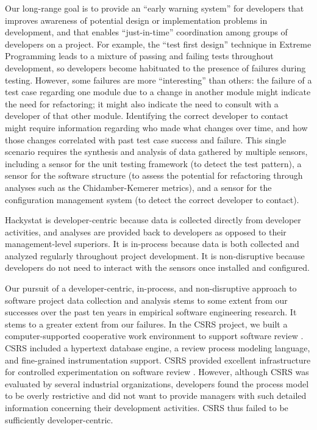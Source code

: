 Our long-range goal is to provide an ``early warning system'' for
developers that improves awareness of potential design or implementation
problems in development, and that enables ``just-in-time''
coordination among groups of developers on a project. For example, the
``test first design'' technique in Extreme Programming leads to a mixture
of passing and failing tests throughout development, so developers become habituated
to the presence of failures during testing. However, some
failures are more ``interesting'' than others: the failure of a test case
regarding one module due to a change in another module might indicate the
need for refactoring; it might also indicate the need to consult with a
developer of that other module. Identifying the correct developer to
contact might require information regarding who made what changes over
time, and how those changes correlated with past test case success and
failure.  This single scenario requires the synthesis and analysis of data
gathered by multiple sensors, including a sensor for the unit testing
framework (to detect the test pattern), a sensor for the software structure
(to assess the potential for refactoring through analyses such as the 
Chidamber-Kemerer metrics), and a sensor for the configuration management
system (to detect the correct developer to contact).

Hackystat is developer-centric because data is collected directly from
developer activities, and analyses are provided back to developers as
opposed to their management-level superiors. It is in-process because data
is both collected and analyzed regularly throughout project development. It
is non-disruptive because developers do not need to interact with the
sensors once installed and configured.

Our pursuit of a developer-centric, in-process, and non-disruptive approach
to software project data collection and analysis stems to some extent from
our successes over the past ten years in empirical software engineering
research. It stems to a greater extent from our failures.  In the CSRS project,
we built a computer-supported cooperative work environment to support
software review \cite{csdl-93-17,csdl-93-22,csdl-95-24,csdl-95-08}.  CSRS
included a hypertext database engine, a review process modeling language,
and fine-grained instrumentation support. CSRS provided excellent
infrastructure for controlled experimentation on software review
\cite{csdl-96-14,csdl-97-02}.  However, although CSRS was evaluated by
several industrial organizations, developers found the process model to be
overly restrictive and did not want to provide managers with such detailed
information concerning their development activities.  CSRS thus failed to
be sufficiently developer-centric.

